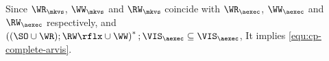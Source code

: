 \begin{itemize}
Since \( \WR_\mkvs \), \( \WW_\mkvs \) and \( \RW_\mkvs \) coincide with
\( \WR_\aexec \), \( \WW_\aexec \) and \( \RW_\aexec \) respectively,
and \( \left( (\SO \cup \WR ) ; \RW\rflx \cup \WW \right)^* ; \VIS_\aexec \subseteq \VIS_\aexec \),
It implies \cref{equ:cp-complete-arvis}.
\end{itemize}
